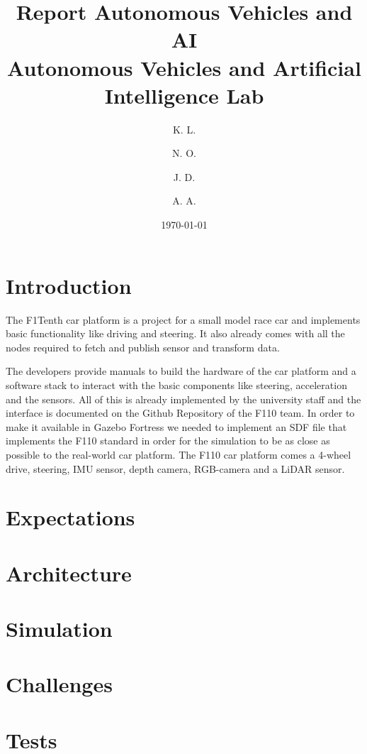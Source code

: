 \documentclass[a4paper,11pt]{article}
\title{Report Autonomous Vehicles and AI\\[1ex]
%
\large Autonomous Vehicles and Artificial Intelligence Lab}
\author{
    K. L. \\
    \and
    N. O. \\
    \and
    J. D. \\
    \and
    A. A.
}
\date{\today}
\begin{document}
\maketitle

\section{Introduction}

The F1Tenth car platform is a project for a small model race car and implements basic functionality like driving and steering. 
It also already comes with all the nodes required to fetch and publish sensor and transform data.

The developers provide manuals to build the hardware of the car platform and a software stack to interact with the basic components like steering, acceleration and the sensors. All of this is already implemented by the university staff and the interface is documented on the Github Repository of the F110 team.
In order to make it available in Gazebo Fortress we needed to implement an SDF file that implements the F110 standard in order for the simulation to be as close as possible to the real-world car platform.
The F110 car platform comes a 4-wheel drive, steering, IMU sensor, depth camera, RGB-camera and a LiDAR sensor.

\section{Expectations}


\section{Architecture}


\section{Simulation}



\section{Challenges}

\section{Tests}




\end{document}
